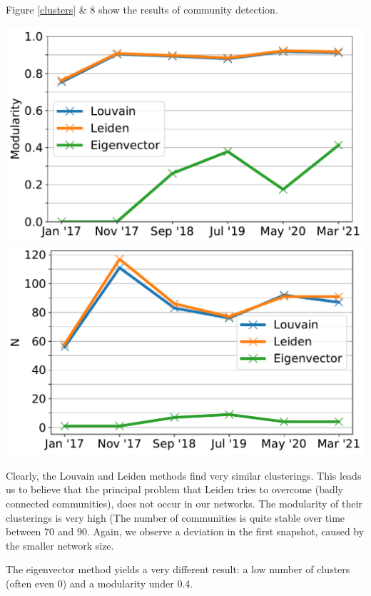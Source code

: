 \documentclass[10pt,a4paper]{article}
\newenvironment{Figure}
  {\par\medskip\noindent\minipage{\linewidth}}
  {\endminipage\par\medskip}
\begin{document}
\begin{multicols}{2}
Figure \ref{clusters} \& 8 show the results of community detection.
\vspace{5pt}
\begin{Figure}
\centering
\includegraphics[scale=0.45]{figures/clusters_modularity.pdf}
\includegraphics[scale=0.45]{figures/clusters_num.pdf}
\label{clusters}
\end{Figure}

Clearly, the Louvain and Leiden methods find very similar clusterings. This leads us to believe that the principal problem that Leiden tries to overcome (badly connected communities), does not occur in our networks. The modularity of their clusterings is very high (The number of communities is quite stable over time between 70 and 90. Again, we observe a deviation in the first snapshot, caused by the smaller network size. 

The eigenvector method yields a very different result: a low number of clusters (often even 0) and a modularity under 0.4.



\end{multicols}
\end{document}
